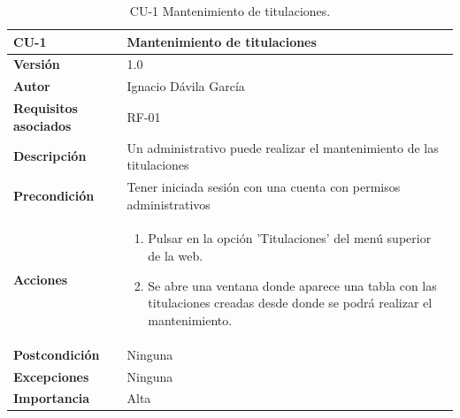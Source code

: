 \begin{table}[p]
	\centering
	\begin{tabularx}{\linewidth}{ p{} p{} }
		\toprule
		\textbf{CU-1}    & \textbf{Mantenimiento de titulaciones}\\
		\toprule
		\textbf{Versión}              & 1.0    \\
		\textbf{Autor}                & Ignacio Dávila García \\
		\textbf{Requisitos asociados} & RF-01 \\
		\textbf{Descripción}          & Un administrativo puede realizar el mantenimiento de las titulaciones \\
		\textbf{Precondición}         & Tener iniciada sesión con una cuenta con permisos administrativos \\
		\textbf{Acciones}             &
		\begin{enumerate}
			\def\labelenumi{\arabic{enumi}.}
			\tightlist
			\item Pulsar en la opción 'Titulaciones' del menú superior de la web.
			\item Se abre una ventana donde aparece una tabla con las titulaciones creadas desde donde se podrá realizar el mantenimiento.
		\end{enumerate}\\
		\textbf{Postcondición}        & Ninguna \\
		\textbf{Excepciones}          & Ninguna \\
		\textbf{Importancia}          & Alta \\
		\bottomrule
	\end{tabularx}
	\caption{CU-1 Mantenimiento de titulaciones.}
\end{table}

